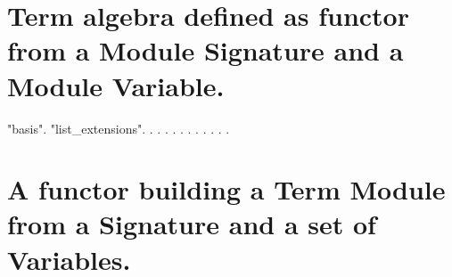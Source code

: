 \documentclass[12pt]{report}
\begin{document}

\begin{coqdoccode}
\coqdocemptyline
\end{coqdoccode}
\section{Term algebra defined as functor from a Module Signature and a Module Variable.}

\begin{coqdoccode}
\coqdocemptyline
\coqdocnoindent
{}  "basis".\coqdoceol
\coqdocnoindent
{}  "list\_extensions".\coqdoceol
\coqdocemptyline
\coqdocnoindent
{}  .\coqdoceol
\coqdocnoindent
{}  .\coqdoceol
\coqdocnoindent
{}  .\coqdoceol
\coqdocnoindent
{}  .\coqdoceol
\coqdocnoindent
{}  .\coqdoceol
\coqdocnoindent
{}  .\coqdoceol
\coqdocnoindent
{}  .\coqdoceol
\coqdocnoindent
{}  .\coqdoceol
\coqdocnoindent
{}  .\coqdoceol
\coqdocnoindent
{}  .\coqdoceol
\coqdocemptyline
\coqdocnoindent
{}.\coqdoceol
\coqdocemptyline
\end{coqdoccode}
\section{A functor building a Term Module from a Signature and a set of Variables.}
\end{document}
